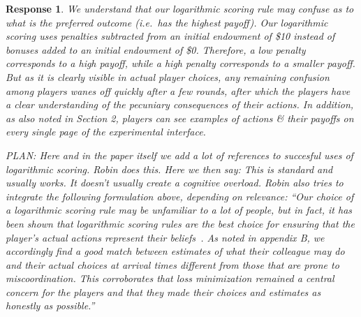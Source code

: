 \documentclass[a4paper]{article}
\newtheorem{response}{Response}
\begin{document}
\begin{enumerate}
  \begin{response}\label{payoff2} 
  We understand that our logarithmic scoring rule may confuse as to what is the preferred outcome (i.e.\ has the highest payoff). Our logarithmic scoring uses penalties subtracted from an initial endowment of \$10 instead of bonuses added to an initial endowment of \$0. Therefore, a low penalty corresponds to a high payoff, while a high penalty corresponds to a smaller payoff. But as it is clearly visible in actual player choices, any remaining confusion among players wanes off quickly after a few rounds, after which the players have a clear understanding of the pecuniary consequences of their actions. In addition, as also noted in Section 2, players can see examples of actions \& their payoffs on every single page of the experimental interface.  
  
PLAN: Here and in the paper itself we add a lot of references to succesful uses of logarithmic scoring. Robin does this. Here we then say: This is standard and usually works. It doesn't usually create a cognitive overload. Robin also tries to integrate the following formulation above, depending on relevance: ``Our choice of a logarithmic scoring rule may be unfamiliar to a lot of people, but in fact, it has been shown that logarithmic scoring rules are the best choice for ensuring that the player's actual actions represent their beliefs~\cite{seidenfeld1985calibration, palfrey2009eliciting}. As noted in appendix B, we accordingly find a good match between estimates of what their colleague may do and their actual choices at arrival times different from those that are prone to miscoordination. This corroborates that loss minimization remained a central concern for the players and that they made their choices and estimates as honestly as possible.''
\end{response}



\end{enumerate}
\end{document}
